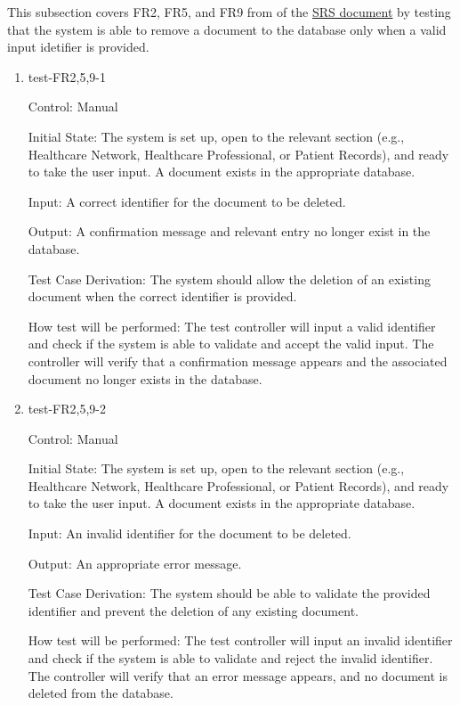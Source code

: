 \documentclass[12pt, titlepage]{article}
\begin{document}
This subsection covers FR2, FR5, and FR9 from of the \href{https://github.com/Inreet-Kaur/capstone/blob/main/docs/SRS/SRS.pdf}{SRS document} \citep{SRS} by testing that the system is able to remove a document to the database only when a valid input idetifier is provided.

\begin{enumerate}

\item{test-FR2,5,9-1} \label{test-FR2,5,9-1}

Control: Manual

Initial State: The system is set up, open to the relevant section (e.g., Healthcare Network, Healthcare Professional, or Patient Records), and ready to take the user input. A document exists in the appropriate database.

Input: A correct identifier for the document to be deleted.

Output: A confirmation message and relevant entry no longer exist in the database.

Test Case Derivation: The system should allow the deletion of an existing document when the correct identifier is provided. 

How test will be performed: The test controller will input a valid identifier and check if the system is able to validate and accept the valid input. The controller will verify that a confirmation message appears and the associated document no longer exists in the database.

					
\item{test-FR2,5,9-2} \label{test-FR2,5,9-2}

Control: Manual

Initial State: The system is set up, open to the relevant section (e.g., Healthcare Network, Healthcare Professional, or Patient Records), and ready to take the user input. A document exists in the appropriate database.

Input: An invalid identifier for the document to be deleted.

Output: An appropriate error message.

Test Case Derivation: The system should be able to validate the provided identifier and prevent the deletion of any existing document. 

How test will be performed: The test controller will input an invalid identifier and check if the system is able to validate and reject the invalid identifier. The controller will verify that an error message appears, and no document is deleted from the database.

\end{enumerate}
\end{document}
